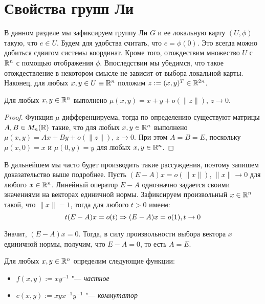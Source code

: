 \section{Свойства групп Ли}

\begin{note}
	В данном разделе мы зафиксируем группу Ли $G$ и ее локальную карту $(U, \phi)$ такую, что $e \in U$. Будем для удобства считать, что $e = \phi(0)$. Это всегда можно добиться сдвигом системы координат. Кроме того, отождествим множество $U$ с $\mathbb{R}^n$ с помощью отображения $\phi$. Впоследствии мы убедимся, что такое отождествление в некотором смысле не зависит от выбора локальной карты. Наконец, для любых $x, y \in U \equiv \mathbb{R}^n$ положим $z := (x, y)^T \in \mathbb{R}^{2n}$.
\end{note}

\begin{proposition}
	Для любых $x, y \in \mathbb{R}^n$ выполнено $\mu(x, y) = x + y + o(\|z\|)$, $z \to 0$.
\end{proposition}

\begin{proof}
	Функция $\mu$ дифференцируема, тогда по определению существуют матрицы $A, B \in M_n(\mathbb{R})$ такие, что для любых $x, y \in \mathbb{R}^n$ выполнено $\mu(x, y) = Ax + By + o(\|z\|)$, $z \to 0$. При этом $A = B = E$, поскольку $\mu(x, 0) = x$ и $\mu(0, y) = y$ для любых $x, y \in \mathbb{R}^n$.
\end{proof}

\begin{note}
	В дальнейшем мы часто будет производить такие рассуждения, поэтому запишем доказательство выше подробнее. Пусть $(E - A)x = o(\|x\|)$, $\|x\| \to 0$ для любого $x \in \mathbb{R}^n$. Линейный оператор $E - A$ однозначно задается своими значениями на векторах единичной нормы. Зафиксируем произвольный $x \in \mathbb{R}^n$ такой, что $\|x\| = 1$, тогда для любого $t > 0$ имеем:
	\[t(E - A)x = o(t) \Rightarrow (E - A)x = o(1), t \to 0\]
	
	Значит, $(E - A)x = 0$. Тогда, в силу произвольности выбора вектора $x$ единичной нормы, получим, что $E - A = 0$, то есть $A = E$.
\end{note}

\begin{definition}
	Для любых $x, y \in \mathbb{R}^n$ определим следующие функции:
	\begin{itemize}
		\item $f(x, y) := xy^{-1}$ "--- \textit{частное}
		\item $c(x, y) := xyx^{-1}y^{-1}$ "--- \textit{коммутатор}
	\end{itemize}
\end{definition}

